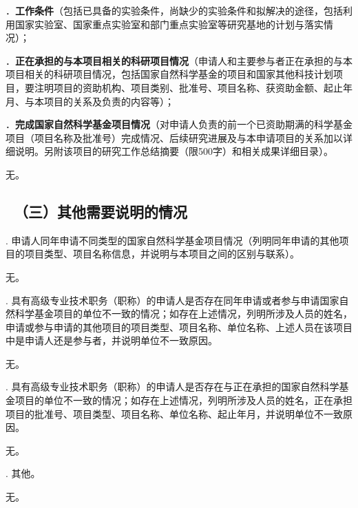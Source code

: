 \documentclass[12pt,UTF8,AutoFakeBold=3,a4paper]{ctexart} %
\begin{document}

\vspace{0.5 \baselineskip}
{\sihao \color{MsBlue} ．{\bfseries 工作条件}（包括已具备的实验条件，尚缺少的实验条件和拟解决的途径，包括利用国家实验室、国家重点实验室和部门重点实验室等研究基地的计划与落实情况）；}
\vspace{0.5 \baselineskip}


{\sihao \color{MsBlue} ．{\bfseries 正在承担的与本项目相关的科研项目情况}（申请人和主要参与者正在承担的与本项目相关的科研项目情况，包括国家自然科学基金的项目和国家其他科技计划项目，要注明项目的资助机构、项目类别、批准号、项目名称、获资助金额、起止年月、与本项目的关系及负责的内容等）；}


{\sihao \color{MsBlue} ．{\bfseries 完成国家自然科学基金项目情况}（对申请人负责的前一个已资助期满的科学基金项目（项目名称及批准号）完成情况、后续研究进展及与本申请项目的关系加以详细说明。另附该项目的研究工作总结摘要（限500字）和相关成果详细目录）。}

\vspace{0.25 \baselineskip}
{\kaishu 无。}

{\color{MsBlue} \subsection{\sihao \kaishu \quad \ （三）其他需要说明的情况 }}

{\sihao \color{MsBlue} . 申请人同年申请不同类型的国家自然科学基金项目情况（列明同年申请的其他项目的项目类型、项目名称信息，并说明与本项目之间的区别与联系）。 }

\vspace{0.25 \baselineskip}
{\kaishu 无。}
\vspace{0.25 \baselineskip}

{\sihao \color{MsBlue} . 具有高级专业技术职务（职称）的申请人是否存在同年申请或者参与申请国家自然科学基金项目的单位不一致的情况；如存在上述情况，列明所涉及人员的姓名，申请或参与申请的其他项目的项目类型、项目名称、单位名称、上述人员在该项目中是申请人还是参与者，并说明单位不一致原因。}

\vspace{0.25 \baselineskip}
{\kaishu 无。}
\vspace{0.25 \baselineskip}

{\sihao \color{MsBlue} . 具有高级专业技术职务（职称）的申请人是否存在与正在承担的国家自然科学基金项目的单位不一致的情况；如存在上述情况，列明所涉及人员的姓名，正在承担项目的批准号、项目类型、项目名称、单位名称、起止年月，并说明单位不一致原因。}

\vspace{0.25 \baselineskip}
{\kaishu 无。}
\vspace{0.25 \baselineskip}

{\sihao \color{MsBlue} . 其他。}

\vspace{0.25 \baselineskip}
{\kaishu 无。}
\vspace{0.25 \baselineskip}
\end{document}
